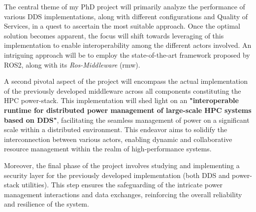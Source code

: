 
The central theme of my PhD project will primarily analyze the performance of various DDS implementations, along with different configurations and Quality of Services, in a quest to ascertain the most suitable approach. Once the optimal solution becomes apparent, the focus will shift towards leveraging of this implementation to enable interoperability among the different actors involved. An intriguing approach will be to employ the state-of-the-art framework proposed by ROS2, along with its \emph{Ros-Middleware} (rmw).

A second pivotal aspect of the project will encompass the actual implementation of the previously developed middleware across all components constituting the HPC power-stack. This implementation will shed light on an \textbf{"interoperable runtime for distributed power management of large-scale HPC systems based on DDS"}, facilitating the seamless management of power on a significant scale within a distributed environment. This endeavor aims to solidify the interconnection between various actors, enabling dynamic and collaborative resource management within the realm of high-performance systems.

Moreover, the final phase of the project involves studying and implementing a security layer for the previously developed implementation (both DDS and power-stack utilities). This step ensures the safeguarding of the intricate power management interactions and data exchanges, reinforcing the overall reliability and resilience of the system.

